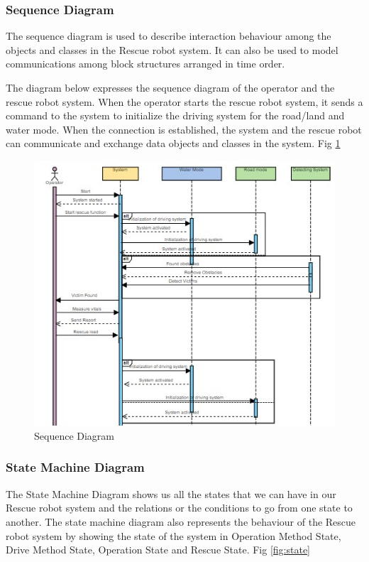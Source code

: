 \documentclass[10pt,journal,compsoc]{IEEEtran}
\begin{document}
\subsubsection{Sequence Diagram}

The sequence diagram is used to describe interaction behaviour among the objects and classes in the Rescue robot system. It can also be used to model communications among block structures arranged in time order. 

The diagram below expresses the sequence diagram of the operator and the rescue robot system. When the operator starts the rescue robot system, it sends a command to the system to initialize the driving system for the road/land and water mode. When the connection is established, the system and the rescue robot can communicate and exchange data objects and classes in the system. Fig \ref{fig:sequence}

\begin{figure}[h]
\includegraphics[scale=0.52]{sequence}
\caption{Sequence Diagram}
\label{fig:sequence}
\end{figure}

\subsubsection{State Machine Diagram}

The State Machine Diagram shows us all the states that we can have in our Rescue robot system and the relations or the conditions to go from one state to another. The state machine diagram also represents the behaviour of the Rescue robot system by showing the state of the system in  Operation Method State, Drive Method State, Operation State and Rescue State. Fig \ref{fig:state}
\end{document}
